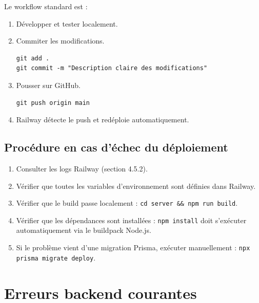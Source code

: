 \documentclass[12pt,a4paper]{report}
\begin{document}
Le workflow standard est :
\begin{enumerate}
    \item Développer et tester localement.
    \item Commiter les modifications.
\begin{lstlisting}
git add .
git commit -m "Description claire des modifications"
\end{lstlisting}
    \item Pousser sur GitHub.
\begin{lstlisting}
git push origin main
\end{lstlisting}
    \item Railway détecte le push et redéploie automatiquement.
\end{enumerate}

\subsection{Procédure en cas d'échec du déploiement}
\begin{enumerate}
    \item Consulter les logs Railway (section 4.5.2).
    \item Vérifier que toutes les variables d'environnement sont définies dans Railway.
    \item Vérifier que le build passe localement : \texttt{cd server \&\& npm run build}.
    \item Vérifier que les dépendances sont installées : \texttt{npm install} doit s'exécuter automatiquement via le buildpack Node.js.
    \item Si le problème vient d'une migration Prisma, exécuter manuellement : \texttt{npx prisma migrate deploy}.
\end{enumerate}

\section{Erreurs backend courantes}
\end{document}
